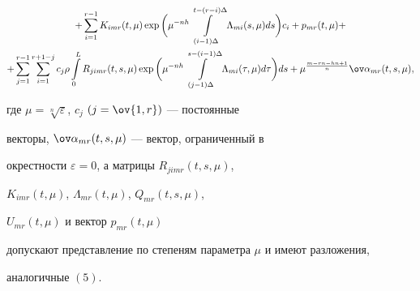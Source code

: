 \begin{thm}
\begin{gather*}
% 


+\sum^{r-1}_{i=1}K_{imr}(t,\mu)\exp\bigg(\mu^{-nh} 


\int\limits^{t-(r-i)\Delta}_{(i-1)\Delta}\Lambda_{mi} 


(s,\mu)ds\bigg)c_i+p_{mr}(t,\mu)+ \\ 


% 


+\sum^{r-1}_{j=1}\sum^{r+1-j}_{i=1}c_j\rho 


\int\limits^L_0 R_{jimr}(t,s,\mu)\exp\bigg(\mu^{-nh} 


\int\limits^{s-(i-1)\Delta}_{(j-1)\Delta}\Lambda_{mi}(\tau,\mu)d\tau 


\bigg)ds+\mu^{\frac{m-rn-hn+1}{n}}\ov\alpha_{mr}(t,s,\mu), 


\end{gather*} 


где $\mu=\sqrt[n]{\varepsilon}$, $c_j$ $(j=\ov{1,r})$ --- постоянные 


векторы, $\ov\alpha_{mr}(t,s,\mu)$ --- вектор, ограниченный в 


окрестности $\varepsilon=0$, а матрицы $R_{jimr}(t,s,\mu)$, 


$K_{imr}(t,\mu)$, $\Lambda_{mr}(t,\mu)$, $Q_{mr}(t,s,\mu)$, 


$U_{mr}(t,\mu)$ и вектор $p_{mr}(t,\mu)$ 


допускают представление по степеням параметра $\mu$ и имеют разложения, 


аналогичные $(5)$. 


\end{thm} 


 


